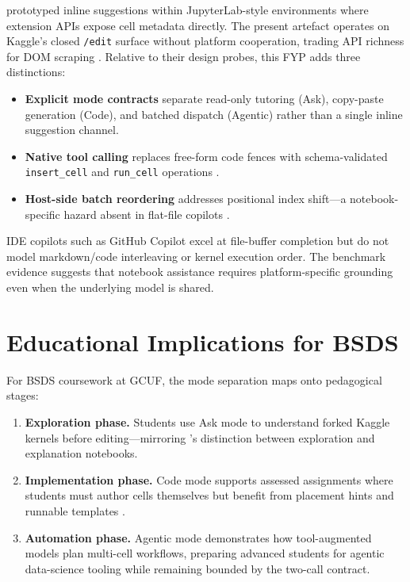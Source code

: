 \textcite{mcnutt2023notebookassistants} prototyped inline suggestions within JupyterLab-style environments where extension APIs expose cell metadata directly. The present artefact operates on Kaggle's closed \texttt{/edit} surface without platform cooperation, trading API richness for \ac{DOM} scraping \parencite{chasins2018roussillon}. Relative to their design probes, this FYP adds three distinctions:

\begin{itemize}
  \item \textbf{Explicit mode contracts} separate read-only tutoring (Ask), copy-paste generation (Code), and batched dispatch (Agentic) rather than a single inline suggestion channel.
  \item \textbf{Native tool calling} replaces free-form code fences with schema-validated \texttt{insert\_cell} and \texttt{run\_cell} operations \parencite{qin2024toolllm}.
  \item \textbf{Host-side batch reordering} addresses positional index shift---a notebook-specific hazard absent in flat-file copilots \parencite{rule2019tenrules}.
\end{itemize}

IDE copilots such as GitHub Copilot excel at file-buffer completion \parencite{ziegler2024copilot} but do not model markdown/code interleaving or kernel execution order. The benchmark evidence suggests that notebook assistance requires platform-specific grounding even when the underlying model is shared.

\section{Educational Implications for BSDS}
\label{sec:edu-implications}

For \acf{BSDS} coursework at \acf{GCUF}, the mode separation maps onto pedagogical stages:

\begin{enumerate}
  \item \textbf{Exploration phase.} Students use Ask mode to understand forked Kaggle kernels before editing---mirroring \textcite{rule2018exploration}'s distinction between exploration and explanation notebooks.
  \item \textbf{Implementation phase.} Code mode supports assessed assignments where students must author cells themselves but benefit from placement hints and runnable templates \parencite{finnieansley2022codex}.
  \item \textbf{Automation phase.} Agentic mode demonstrates how tool-augmented models plan multi-cell workflows, preparing advanced students for agentic data-science tooling while remaining bounded by the two-call contract.
\end{enumerate}

